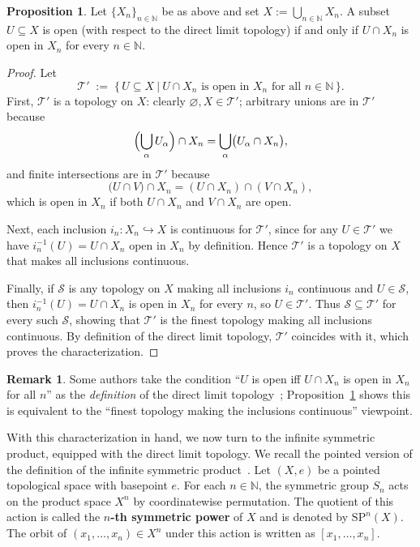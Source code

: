 \documentclass[10pt,a4paper]{article}
\theoremstyle{definition}
\newtheorem{proposition}[theorem]{Proposition}
\newtheorem{remark}[theorem]{Remark}
\newcommand{\SP}{\mathrm{SP}}
\newcommand{\N}{\mathbb{N}}
\begin{document}
\begin{proposition}\label{prop:dl-open-iff-intersections}
Let $\{X_{n}\}_{n \in \N}$ be as above and set $X := \bigcup_{n \in \N} X_{n}$.
A subset $U \subseteq X$ is open (with respect to the direct limit topology)
if and only if $U \cap X_{n}$ is open in $X_{n}$ for every $n \in \N$.
\end{proposition}

\begin{proof}
Let
\[
\mathcal{T}' \;:=\; \bigl\{\, U \subseteq X \ \big|\ 
U \cap X_{n} \text{ is open in } X_{n} \text{ for all } n \in \N \,\bigr\}.
\]
First, $\mathcal{T}'$ is a topology on $X$: clearly $\varnothing, X \in \mathcal{T}'$;
arbitrary unions are in $\mathcal{T}'$ because
\[
\Bigl(\bigcup_{\alpha} U_{\alpha}\Bigr) \cap X_{n}
= \bigcup_{\alpha} \bigl(U_{\alpha} \cap X_{n}\bigr),
\]
and finite intersections are in $\mathcal{T}'$ because
\[
\bigl(U \cap V\bigr)\cap X_{n}=(U\cap X_{n})\cap(V\cap X_{n}),
\]
which is open in $X_{n}$ if both $U\cap X_{n}$ and $V\cap X_{n}$ are open.

Next, each inclusion $i_{n}\colon X_{n}\hookrightarrow X$ is continuous for
$\mathcal{T}'$, since for any $U\in\mathcal{T}'$ we have
$i_{n}^{-1}(U)=U\cap X_{n}$ open in $X_{n}$ by definition.
Hence $\mathcal{T}'$ is a topology on $X$ that makes all inclusions continuous.

Finally, if $\mathcal{S}$ is any topology on $X$ making all inclusions $i_{n}$ continuous
and $U\in\mathcal{S}$, then $i_{n}^{-1}(U)=U\cap X_{n}$ is open in $X_{n}$ for every $n$,
so $U\in\mathcal{T}'$. Thus $\mathcal{S}\subseteq\mathcal{T}'$ for every such $\mathcal{S}$,
showing that $\mathcal{T}'$ is the finest topology making all inclusions continuous.
By definition of the direct limit topology, $\mathcal{T}'$ coincides with it,
which proves the characterization.
\end{proof}

\begin{remark}
Some authors take the condition “$U$ is open iff $U\cap X_{n}$ is open in $X_{n}$ for all $n$”
as the \emph{definition} of the direct limit topology~\cite{banakh2012direct, glockner2003direct}; Proposition~\ref{prop:dl-open-iff-intersections}
shows this is equivalent to the “finest topology making the inclusions continuous” viewpoint.
\end{remark}

With this characterization in hand, we now turn to the infinite symmetric product,
equipped with the direct limit topology.
We recall the pointed version of the definition of the infinite symmetric
product~\cite{dold1958quasifaserungen}.
Let $(X,e)$ be a pointed topological space with basepoint $e$.
For each $n \in \N$, the symmetric group $S_{n}$ acts on the product space
$X^{n}$ by coordinatewise permutation.
The quotient of this action is called the \textbf{$n$-th symmetric power}
of $X$ and is denoted by $\SP^{n}(X)$.
The orbit of $(x_{1},\dots,x_{n}) \in X^{n}$ under this action is written
as $[x_{1},\dots,x_{n}]$.
\end{document}
